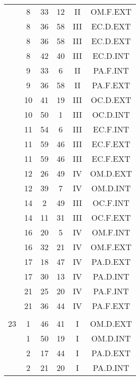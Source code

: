 \documentclass[12pt, a4paper]{article}
\begin{document}
\begin{multicols}{3}
{\begin{tabular}{c c c c c c}
	 	 	 	 & 8 & 33 & 12 & II & OM.F.EXT\\%
	 	 	 	 & 8 & 36 & 58 & III & EC.D.EXT\\%
	 	 	 	 & 8 & 36 & 58 & III & EC.D.EXT\\%
	 	 	 	 & 8 & 42 & 40 & III & EC.D.INT\\%
	 	 	 	 & 9 & 33 & 6 & II & PA.F.INT\\%
	 	 	 	 & 9 & 36 & 58 & II & PA.F.EXT\\%
	 	 	 	 & 10 & 41 & 19 & III & OC.D.EXT\\%
	 	 	 	 & 10 & 50 & 1 & III & OC.D.INT\\%
	 	 	 	 & 11 & 54 & 6 & III & EC.F.INT\\%
	 	 	 	 & 11 & 59 & 46 & III & EC.F.EXT\\%
	 	 	 	 & 11 & 59 & 46 & III & EC.F.EXT\\%
	 	 	 	 & 12 & 26 & 49 & IV & OM.D.EXT\\%
	 	 	 	 & 12 & 39 & 7 & IV & OM.D.INT\\%
	 	 	 	 & 14 & 2 & 49 & III & OC.F.INT\\%
	 	 	 	 & 14 & 11 & 31 & III & OC.F.EXT\\%
	 	 	 	 & 16 & 20 & 5 & IV & OM.F.INT\\%
	 	 	 	 & 16 & 32 & 21 & IV & OM.F.EXT\\%
	 	 	 	 & 17 & 18 & 47 & IV & PA.D.EXT\\%
	 	 	 	 & 17 & 30 & 13 & IV & PA.D.INT\\%
	 	 	 	 & 21 & 25 & 20 & IV & PA.F.INT\\%
	 	 	 	 & 21 & 36 & 44 & IV & PA.F.EXT\\%
	 	 	 	 & & & & & \\%
	 	 	 	23 & 1 & 46 & 41 & I & OM.D.EXT\\%
	 	 	 	 & 1 & 50 & 19 & I & OM.D.INT\\%
	 	 	 	 & 2 & 17 & 44 & I & PA.D.EXT\\%
	 	 	 	 & 2 & 21 & 20 & I & PA.D.INT\\%
	 	 \end{tabular}
 	}
\end{multicols}
\end{document}

